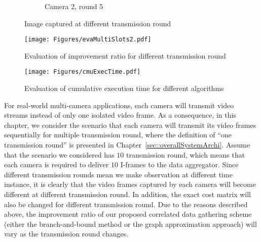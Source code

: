 {{\begin{figure}
\begin{center}
\begin{subfigure}[b]{0.4\columnwidth}
\caption{Camera 2, round 5}
\end{subfigure}
\caption{\label{fig::imgCapMultiSlots} Image captured at different transmission round}
\end{center}
\end{figure}
} %
%
\begin{figure}
\begin{center}
\texttt{[image: Figures/evaMultiSlots2.pdf]}
\caption{\label{fig::evaMultiSlots}Evaluation of improvement ratio for different transmission round}
\end{center}
\end{figure}
%
\begin{figure}
\begin{center}
\texttt{[image: Figures/cmuExecTime.pdf]}
\caption{\label{fig::evaExecTime}Evaluation of cumulative execution time for different algorithms}
\end{center}
\end{figure}
%
For real-world multi-camera applications, each camera will transmit video streams instead of only one isolated video frame.
As a consequence, in this chapter, we consider the scenario that each camera will transmit its video frames sequentially for multiple transmission round, where the definition of ``one transmission round'' is presented in Chapter~\ref{sec::overallSystemArchi}.
Assume that the scenario we considered has $10$ transmission round, which means that each camera is required to deliver $10$ I-frames to the data aggregator.
Since different transmission rounds mean we make observation at different time instance, it is clearly that the video frames captured by each camera will become different at different transmission round.
In addition, the exact cost matrix will also be changed for different transmission round.
Due to the reasons described above, the improvement ratio of our proposed correlated data gathering scheme (either the branch-and-bound method or the graph approximation approach) will vary as the transmission round changes.

}

